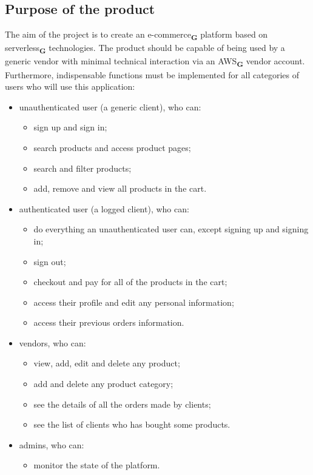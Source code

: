 \subsection{Purpose of the product}
The aim of the project is to create an e-commerce\textsubscript{\textbf{G}} platform based on serverless\textsubscript{\textbf{G}} technologies.
The product should be capable of being used by a generic vendor with minimal technical interaction
via an AWS\textsubscript{\textbf{G}} vendor account.
Furthermore, indispensable functions must be implemented for all categories of users who will use this application:
\begin{itemize}
    \item unauthenticated user (a generic client), who can:
          \begin{itemize}
              \item sign up and sign in;
              \item search products and access product pages;
              \item search and filter products;
              \item add, remove and view all products in the cart.
          \end{itemize}
    \item authenticated user (a logged client), who can:
          \begin{itemize}
              \item do everything an unauthenticated user can, except signing up and signing in;
              \item sign out;
              \item checkout and pay for all of the products in the cart;
              \item access their profile and edit any personal information;
              \item access their previous orders information.
          \end{itemize}
    \item vendors, who can:
          \begin{itemize}
              \item view, add, edit and delete any product;
              \item add and delete any product category;
              \item see the details of all the orders made by clients;
              \item see the list of clients who has bought some products.
          \end{itemize}
    \item admins, who can:
          \begin{itemize}
              \item monitor the state of the platform.
          \end{itemize}
\end{itemize}
